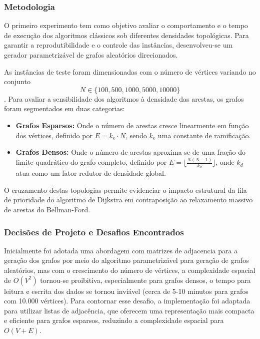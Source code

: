 \documentclass[10pt,a4paper]{article}
\begin{document}
\subsubsection{Metodologia}

O primeiro experimento tem como objetivo avaliar o comportamento e o tempo de execução dos algoritmos clássicos sob diferentes densidades topológicas. Para garantir a reprodutibilidade e o controle das instâncias, desenvolveu-se um gerador parametrizável de grafos aleatórios direcionados.

As instâncias de teste foram dimensionadas com o número de vértices variando no conjunto 
\[
  N \in \{100, 500, 1000, 5000, 10000\}
\].
Para avaliar a sensibilidade dos algoritmos à densidade das arestas, os grafos foram segmentados em duas categorias:
\begin{itemize}
    \item \textbf{Grafos Esparsos:} Onde o número de arestas cresce linearmente em função dos vértices, definido por $E = k_e \cdot N$, sendo $k_e$ uma constante de ramificação.
    \item \textbf{Grafos Densos:} Onde o número de arestas aproxima-se de uma fração do limite quadrático do grafo completo, definido por $E = \lfloor \frac{N(N-1)}{k_d} \rfloor$, onde $k_d$ atua como um fator redutor de densidade global.
\end{itemize}

O cruzamento destas topologias permite evidenciar o impacto estrutural da fila de prioridade do algoritmo de Dijkstra em contraposição ao relaxamento massivo de arestas do Bellman-Ford.


\subsubsection{Decisões de Projeto e Desafios Encontrados}

Inicialmente foi adotada uma abordagem com matrizes de adjacencia para a geração dos grafos por meio do algoritmo parametrizável para geração de grafos aleatórios, mas com o crescimento do número de vértices, a complexidade espacial de $O(V^2)$ tornou-se proibitiva, especialmente para grafos densos, o tempo para leitura e escrita dos dados se tornou inviável (cerca de 5-10 minutos para grafos com 10.000 vértices). Para contornar esse desafio, a implementação foi adaptada para utilizar listas de adjacência, que oferecem uma representação mais compacta e eficiente para grafos esparsos, reduzindo a complexidade espacial para $O(V + E)$.
\end{document}
